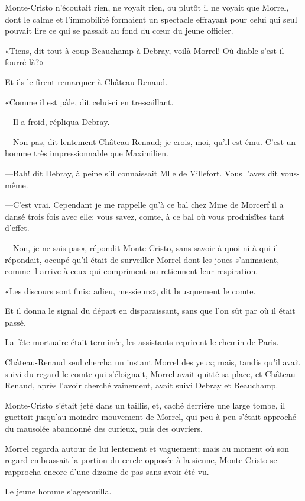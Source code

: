 Monte-Cristo n'écoutait rien, ne voyait rien, ou plutôt il ne voyait que Morrel, dont le calme et l'immobilité formaient un spectacle effrayant pour celui qui seul pouvait lire ce qui se passait au fond du cœur du jeune officier. 

«Tiens, dit tout à coup Beauchamp à Debray, voilà Morrel! Où diable s'est-il fourré là?» 

Et ils le firent remarquer à Château-Renaud. 

«Comme il est pâle, dit celui-ci en tressaillant. 

—Il a froid, répliqua Debray. 

—Non pas, dit lentement Château-Renaud; je crois, moi, qu'il est ému. C'est un homme très impressionnable que Maximilien. 

—Bah! dit Debray, à peine s'il connaissait Mlle de Villefort. Vous l'avez dit vous-même. 

—C'est vrai. Cependant je me rappelle qu'à ce bal chez Mme de Morcerf il a dansé trois fois avec elle; vous savez, comte, à ce bal où vous produisîtes tant d'effet. 

—Non, je ne sais pas», répondit Monte-Cristo, sans savoir à quoi ni à qui il répondait, occupé qu'il était de surveiller Morrel dont les joues s'animaient, comme il arrive à ceux qui compriment ou retiennent leur respiration. 

«Les discours sont finis: adieu, messieurs», dit brusquement le comte. 

Et il donna le signal du départ en disparaissant, sans que l'on sût par où il était passé. 

La fête mortuaire était terminée, les assistants reprirent le chemin de Paris. 

Château-Renaud seul chercha un instant Morrel des yeux; mais, tandis qu'il avait suivi du regard le comte qui s'éloignait, Morrel avait quitté sa place, et Château-Renaud, après l'avoir cherché vainement, avait suivi Debray et Beauchamp. 

Monte-Cristo s'était jeté dans un taillis, et, caché derrière une large tombe, il guettait jusqu'au moindre mouvement de Morrel, qui peu à peu s'était approché du mausolée abandonné des curieux, puis des ouvriers. 

Morrel regarda autour de lui lentement et vaguement; mais au moment où son regard embrassait la portion du cercle opposée à la sienne, Monte-Cristo se rapprocha encore d'une dizaine de pas sans avoir été vu. 

Le jeune homme s'agenouilla. 

